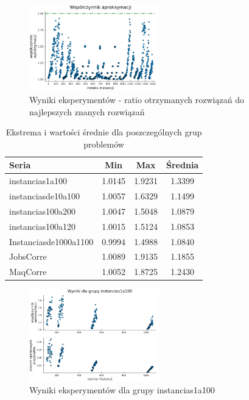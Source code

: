 \documentclass{article}
\begin{document}
\begin{figure}[h!]
    \centering
    \includegraphics[width=0.5\textwidth]{../approximation_ratio_plot.png}
    \caption{Wyniki eksperymentów - ratio otrzymanych rozwiązań do najlepszych znanych rozwiązań}
    \label{fig:results}
\end{figure}

\begin{table}[h!]
    \centering
    \begin{tabular}{l | c c c}
        \textbf{Seria} & \textbf{Min} & \textbf{Max} & \textbf{Średnia} \\
        \hline
        instancias1a100 & 1.0145 & 1.9231 & 1.3399 \\
        instanciasde10a100 & 1.0057 & 1.6329 & 1.1499 \\
        instancias100a200 & 1.0047 & 1.5048 & 1.0879 \\
        instancias100a120 & 1.0015 & 1.5124 & 1.0853 \\
        Instanciasde1000a1100 & 0.9994 & 1.4988 & 1.0840 \\
        JobsCorre & 1.0089 & 1.9135 & 1.1855 \\
        MaqCorre & 1.0052 & 1.8725 & 1.2430 \\
    \end{tabular}
    \caption{Ekstrema i wartości średnie dla poszczególnych grup problemów}
    \label{tab:approximation_ratios}
\end{table}

\begin{figure}[h!]
    \centering
    \includegraphics[width=0.5\textwidth]{../approximation_ratio_group_instancias1a100.png}
    \caption{Wyniki eksperymentów dla grupy instancias1a100}
    \label{fig:group_instancias1a100}
\end{figure}
\end{document}
